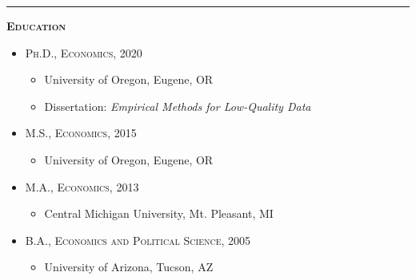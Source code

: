 \documentclass[12pt]{article}
\begin{document}
\bigskip 




\hrule
\bigskip 
\noindent \textsc{\large \textbf{Education}}

\begin{itemize}
\item[] \textsc{Ph.D., Economics, 2020}
\begin{itemize}[topsep=-1em, noitemsep]
\item[] University of Oregon, Eugene, OR
\item[] Dissertation: \textit{Empirical Methods for Low-Quality Data}
\end{itemize}
\end{itemize}

\begin{itemize}
\item[] \textsc{M.S., Economics, 2015}
\begin{itemize}[topsep=-1em, noitemsep]
\item[] University of Oregon, Eugene, OR
\end{itemize}
\end{itemize}

\begin{itemize}
\item[] \textsc{M.A., Economics, 2013}
\begin{itemize}[topsep=-1em, noitemsep]
\item[] Central Michigan University, Mt. Pleasant, MI
\end{itemize}
\end{itemize}

\begin{itemize}
\item[] \textsc{B.A., Economics and Political Science, 2005}
\begin{itemize}[topsep=-1em, noitemsep]
\item[] University of Arizona, Tucson, AZ
\end{itemize}
\end{itemize}
\end{document}
